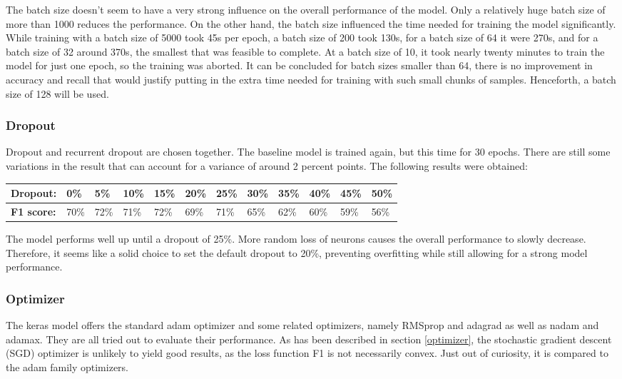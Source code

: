 \documentclass[
	a4paper,
	pagesize,
	pdftex,
	12pt,
	twoside, %
	BCOR=5mm, %
	ngerman,
	fleqn,
	final,
	]{scrartcl}
\begin{document}
The batch size doesn't seem to have a very strong influence on the overall performance of the model. Only a relatively huge batch size of more than 1000 reduces the performance. On the other hand, the batch size influenced the time needed for training the model significantly. While training with a batch size of 5000 took 45s per epoch, a batch size of 200 took 130s, for a batch size of 64 it were 270s, and for a batch size of 32 around 370s, the smallest that was feasible to complete. At a batch size of 10, it took nearly twenty minutes to train the model for just one epoch, so the training was aborted. It can be concluded for batch sizes smaller than 64, there is no improvement in accuracy and recall that would justify putting in the extra time needed for training with such small chunks of samples. Henceforth, a batch size of 128 will be used.

\subsubsection{Dropout}
Dropout and recurrent dropout are chosen together. The baseline model is trained again, but this time for 30 epochs. There are still some variations in the result that can account for a variance of around 2 percent points. The following results were obtained:

\begin{tabular} { | p{2cm} || p{0.7cm} | p{0.7cm} | p{0.7cm} | p{0.7cm}  | p{0.7cm} | p{0.7cm} | p{0.7cm} | p{0.7cm} | p{0.7cm} | p{0.7cm} | p{0.7cm} |}
\hline
\textbf{Dropout:}  & 0\% & 5\% & 10\% & 15\%   & 20\% & 25\% & 30\% & 35\% & 40\% & 45\% & 50\% \\   
\hline
\textbf{F1 score:} & 70\% & 72\% & 71\% & 72\% & 69\% & 71\% & 65\% & 62\% & 60\% & 59\% & 56\% \\
\hline
\hline
\end{tabular}

The model performs well up until a dropout of 25\%. More random loss of neurons causes the overall performance to slowly decrease. Therefore, it seems like a solid choice to set the default dropout to 20\%, preventing overfitting while still allowing for a strong model performance.

\subsubsection{Optimizer}

The keras model offers the standard adam optimizer and some related optimizers, namely RMSprop and adagrad as well as nadam and adamax. They are all tried out to evaluate their performance. As has been described in section \ref{optimizer}, the stochastic gradient descent (SGD) optimizer is unlikely to yield good results, as the loss function F1 is not necessarily convex. Just out of curiosity, it is compared to the adam family optimizers. 
\end{document}
